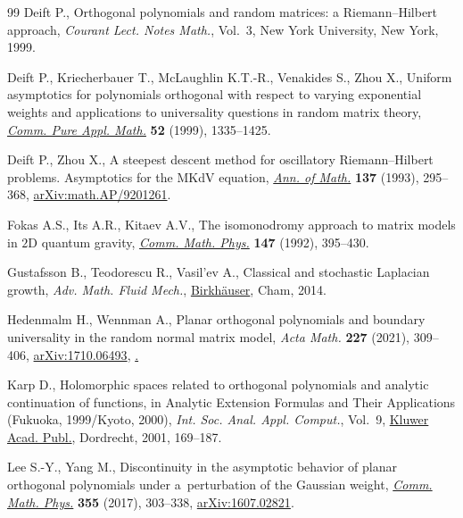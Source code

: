 \documentclass[pdftex]{sigma}
\numberwithin{equation}{section}
\begin{document}
\begin{thebibliography}{99}
Deift P., Orthogonal polynomials and random matrices: a {R}iemann--{H}ilbert
 approach, \textit{Courant Lect. Notes Math.}, Vol.~3, New York University,
 New York, 1999.

Deift P., Kriecherbauer T., McLaughlin K.T.-R., Venakides S., Zhou X., Uniform
 asymptotics for polynomials orthogonal with respect to varying exponential
 weights and applications to universality questions in random matrix theory,
 \href{https://doi.org/10.1002/(SICI)1097-0312(199911)52:11<1335::AID-CPA1>3.0.CO;2-1}{\textit{Comm. Pure Appl. Math.}} \textbf{52} (1999), 1335--1425.

Deift P., Zhou X., A steepest descent method for oscillatory
 {R}iemann--{H}ilbert problems. {A}symptotics for the {MK}d{V} equation,
 \href{https://doi.org/10.2307/2946540}{\textit{Ann. of Math.}} \textbf{137} (1993), 295--368,
 \href{https://arxiv.org/abs/math.AP/9201261}{arXiv:math.AP/9201261}.

Fokas A.S., Its A.R., Kitaev A.V., The isomonodromy approach to matrix models
 in {$2$}{D} quantum gravity, \href{https://doi.org/10.1007/BF02096594}{\textit{Comm. Math. Phys.}} \textbf{147} (1992),
 395--430.

Gustafsson B., Teodorescu R., Vasil'ev A., Classical and stochastic {L}aplacian
 growth, \textit{Adv. Math. Fluid Mech.}, \href{https://doi.org/10.1007/978-3-319-08287-5}{Birkh\"auser}, Cham, 2014.

Hedenmalm H., Wennman A., Planar orthogonal polynomials and boundary
 universality in the random normal matrix model, \textit{Acta Math.}
 \textbf{227} (2021), 309--406, \href{https://arxiv.org/abs/#2}{arXiv:1710.06493},
 \href{https://doi.org/10.4310/acta.2021.v227.n2.a3}.

Karp D., Holomorphic spaces related to orthogonal polynomials and analytic
 continuation of functions, in Analytic Extension Formulas and Their
 Applications ({F}ukuoka, 1999/{K}yoto, 2000), \textit{Int. Soc. Anal. Appl.
 Comput.}, Vol.~9, \href{https://doi.org/10.1007/978-1-4757-3298-6_10}{Kluwer Acad. Publ.}, Dordrecht, 2001, 169--187.


Lee S.-Y., Yang M., Discontinuity in the asymptotic behavior of planar
 orthogonal polynomials under a~perturbation of the {G}aussian weight,
 \href{https://doi.org/10.1007/s00220-017-2888-8}{\textit{Comm. Math. Phys.}} \textbf{355} (2017), 303--338,
 \href{https://arxiv.org/abs/1607.02821}{arXiv:1607.02821}.


\end{thebibliography}
\end{document}
